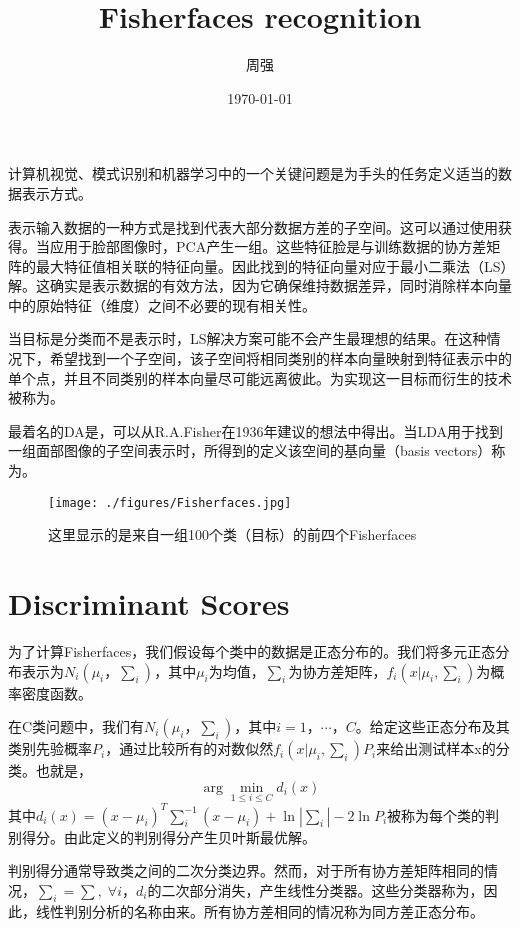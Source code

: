 \documentclass[UTF8]{ctexart}
\title{Fisherfaces recognition}
\author{周强}
\date{\today}
\begin{document}
\maketitle %
计算机视觉、模式识别和机器学习中的一个关键问题是为手头的任务定义适当的数据表示方式。

表示输入数据的一种方式是找到代表大部分数据方差的子空间。这可以通过使用{\color{blue}{主成分分析（PCA）}}获得。当应用于脸部图像时，PCA产生一组{\color{blue}{特征脸（eigenfaces）}}。这些特征脸是与训练数据的协方差矩阵的最大特征值相关联的特征向量。因此找到的特征向量对应于最小二乘法（LS）解。这确实是表示数据的有效方法，因为它确保维持数据差异，同时消除样本向量中的原始特征（维度）之间不必要的现有相关性。

当目标是分类而不是表示时，LS解决方案可能不会产生最理想的结果。在这种情况下，希望找到一个子空间，该子空间将相同类别的样本向量映射到特征表示中的单个点，并且不同类别的样本向量尽可能远离彼此。为实现这一目标而衍生的技术被称为{\color{blue}{判别分析（DA）}}。

最着名的DA是{\color{blue}{线性判别分析（LDA）}}，可以从R.A.Fisher在1936年建议的想法中得出。当LDA用于找到一组面部图像的子空间表示时，所得到的定义该空间的基向量（basis vectors）称为{\color{blue}{Fisherfaces}}。
\begin{figure}[!h]
	\centerline{\texttt{[image: ./figures/Fisherfaces.jpg]}}
	\caption{这里显示的是来自一组100个类（目标）的前四个Fisherfaces}
\end{figure}

\section{Discriminant Scores}
为了计算Fisherfaces，我们假设每个类中的数据是正态分布的。我们将多元正态分布表示为$N_i(\mu_i，\sum_i)$，其中$\mu_i$为均值，$\sum_i$为协方差矩阵，$f_i(x|\mu_i, \sum_i)$为概率密度函数。

在C类问题中，我们有$N_i(\mu_i，\sum_i)$，其中$i = 1，\cdots，C$。给定这些正态分布及其类别先验概率$P_i$，通过比较所有的对数似然$f_i(x|\mu_i, \sum_i)P_i$来给出测试样本x的分类。也就是，
\begin{equation}
	\arg \min_{1\le i \le C}d_i(x)
\end{equation}
其中$d_i(x)=(x-\mu_i)^T\sum_i^{-1}(x-\mu_i) + \ln |\sum_i| -2 \ln P_i$被称为每个类的判别得分。由此定义的判别得分产生贝叶斯最优解。

判别得分通常导致类之间的二次分类边界。然而，对于所有协方差矩阵相同的情况，$\sum_i= \sum,\; \forall i$，$d_i$的二次部分消失，产生线性分类器。这些分类器称为{\color{blue}{线性判别基}}，因此，线性判别分析的名称由来。所有协方差相同的情况称为同方差正态分布。
\end{document}
